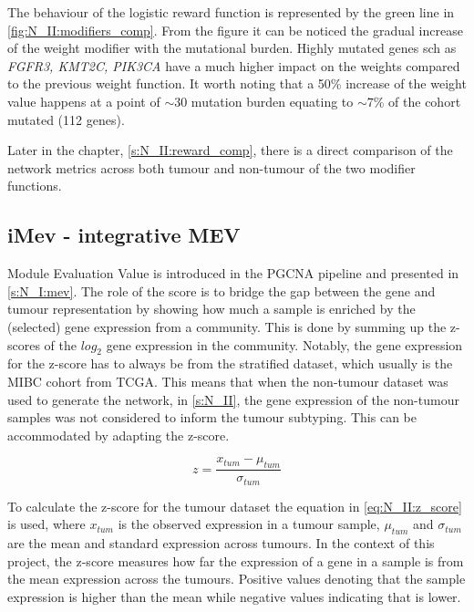 The behaviour of the logistic reward function is represented by the green line in \cref{fig:N_II:modifiers_comp}. From the figure it can be noticed the gradual increase of the weight modifier with the mutational burden. Highly mutated genes sch as \textit{FGFR3, KMT2C, PIK3CA} have a much higher impact on the weights compared to the previous weight function. It worth noting that a 50\% increase of the weight value happens at a point of $\sim$30 mutation burden equating to $\sim7$\% of the cohort mutated (112 genes).

Later in the chapter, \cref{s:N_II:reward_comp}, there is a direct comparison of the network metrics across both tumour and non-tumour of the two modifier functions.



\subsection*{iMev - integrative MEV} \label{s:N_II:iMEV}

Module Evaluation Value is introduced in the PGCNA pipeline \citep{Care2019-ij} and presented in \cref{s:N_I:mev}. The role of the score is to bridge the gap between the gene and tumour representation by showing how much a sample is enriched by the (selected) gene expression from a community. This is done by summing up the z-scores of the $log_2$ gene expression in the community. Notably, the gene expression for the z-score has to always be from the stratified dataset, which usually is the MIBC cohort from TCGA. This means that when the non-tumour dataset was used to generate the network, in \cref{s:N_II}, the gene expression of the non-tumour samples was not considered to inform the tumour subtyping. This can be accommodated by adapting the z-score.

\begin{equation} \label{eq:N_II:z_score}
z = \frac{x_{tum} - \mu_{tum}}{\sigma_{tum}}
\end{equation}

To calculate the z-score for the tumour dataset the equation in \cref{eq:N_II:z_score} is used, where $x_{tum}$ is the observed expression in a tumour sample, $\mu_{tum}$ and $\sigma_{tum}$ are the mean and standard expression across tumours. In the context of this project, the z-score measures how far the expression of a gene in a sample is from the mean expression across the tumours. Positive values denoting that the sample expression is higher than the mean while negative values indicating that is lower.


